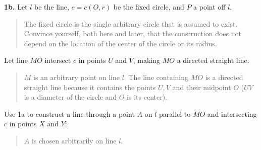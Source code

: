 \documentclass[11pt,a4paper]{article}
\begin{document}
\textbf{1b.} Let $l$ be the line, $c = c(O,r)$ be the fixed circle, and $P$ a point off $l$.
\begin{quote}
\vspace*{-10pt}
The fixed circle is the single arbitrary circle that is assumed to exist. Convince yourself, both here and later, that the construction does not depend on the location of the center of the circle or its radius.
\end{quote}
\begin{center}
\vspace*{-16pt}
\end{center}
Let line $MO$ intersect $c$ in points $U$ and $V$, making $MO$ a directed straight line.
\begin{quote}
\vspace*{-10pt}
$M$ is an arbitrary point on line $l$. The line containing $MO$ is a directed straight line because it contains the points $U,V$ and their midpoint $O$ ($UV$ is a diameter of the circle and $O$ is its center).
\vspace*{-10pt}
\end{quote}
Use 1a to construct a line through a point $A$ on $l$ parallel to $MO$ and intersecting $c$ in points $X$ and $Y$:
\begin{quote}
\vspace*{-10pt}
$A$ is chosen arbitrarily on line $l$.
\vspace*{-10pt}
\end{quote}
\end{document}

